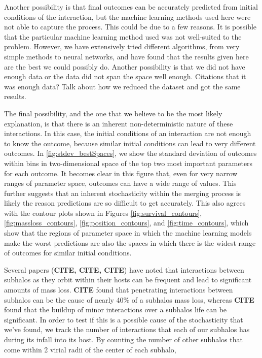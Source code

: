 \documentclass[fleqn,usenatbib]{mnras}
\newcommand\edits[1]{{\color{red}#1}}
\begin{document}
{Another possibility is that final outcomes can be accurately predicted from initial conditions of the interaction, but the machine learning methods used here were not able to capture the process. This could be due to a few reasons. It is possible that the particular machine learning method used was not well-suited to the problem. However, we have extensively tried different algorithms, from very simple methods to neural networks, and have found that the results given here are the best we could possibly do. Another possibility is that we did not have enough data or the data did not span the space well enough. \edits{Citations that it was enough data? Talk about how we reduced the dataset and got the same results.}

The final possibility, and the one that we believe to be the most likely explanation, is that there is an inherent non-deterministic nature of these interactions. In this case, the initial conditions of an interaction are not enough to know the outcome, because similar initial conditions can lead to very different outcomes. In \ref{fig:stdev_bestSpaces}, we show the standard deviation of outcomes within bins in two-dimensional space of the top two most important parameters for each outcome. It becomes clear in this figure that, even for very narrow ranges of parameter space, outcomes can have a wide range of values. This further suggests that an inherent stochasticity within the merging process is likely the reason predictions are so difficult to get accurately. This also agrees with the contour plots shown in Figures \ref{fig:survival_contours}, \ref{fig:massloss_contours}, \ref{fig:position_contours}, and \ref{fig:time_contours}, which show that the regions of parameter space in which the machine learning models make the worst predictions are also the spaces in which there is the widest range of outcomes for similar initial conditions.

Several papers (\textbf{CITE, CITE, CITE}) have noted that interactions between subhalos as they orbit within their hosts can be frequent and lead to significant amounts of mass loss. \textbf{CITE} found that penetrating interactions between subhalos can be the cause of nearly 40\% of a subhalos mass loss, whereas \textbf{CITE} found that the buildup of minor interactions over a subhalos life can be significant. In order to test if this is a possible cause of the stochasticity that we've found, we track the number of interactions that each of our subhalos has during its infall into its host. By counting the number of other subhalos that come within 2 virial radii of the center of each subhalo,

}
\end{document}
